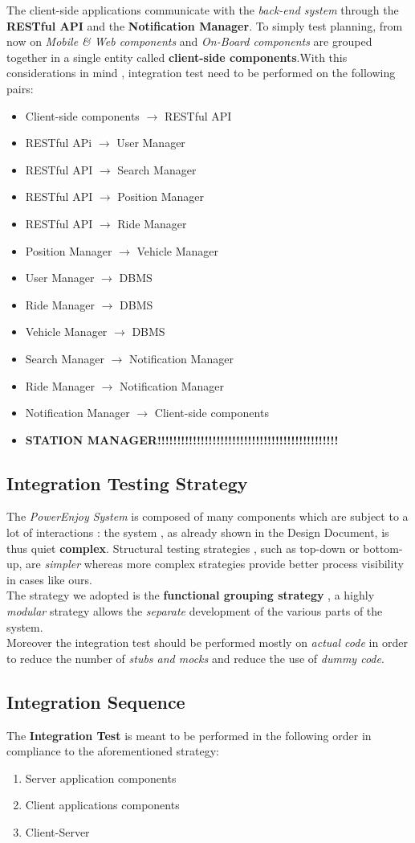 The client-side applications communicate with the \emph{back-end system} through the \textbf{RESTful API} and the \textbf{Notification Manager}. To simply test planning, from now on \emph{Mobile \& Web components} and \emph{On-Board components} are grouped together in a single entity called \textbf{client-side components}.With this considerations in mind , integration test need to be performed on the following pairs:
\begin{itemize}
\item Client-side components $\rightarrow$ RESTful API
\item RESTful APi $\rightarrow$ User Manager
\item RESTful API $\rightarrow$ Search Manager
\item RESTful API $\rightarrow$ Position Manager
\item RESTful API $\rightarrow$ Ride Manager
\item Position Manager $\rightarrow$ Vehicle Manager
\item User Manager $\rightarrow$ DBMS 
\item Ride Manager $\rightarrow$ DBMS
\item Vehicle Manager $\rightarrow$ DBMS
\item Search Manager $\rightarrow$ Notification Manager
\item Ride Manager $\rightarrow$ Notification Manager
\item Notification Manager $\rightarrow$ Client-side components
\item \textbf{STATION MANAGER!!!!!!!!!!!!!!!!!!!!!!!!!!!!!!!!!!!!!!!!!!!!!!}
\end{itemize}

\subsection{Integration Testing Strategy}
The \emph{PowerEnjoy System} is composed of many components which are subject to a lot of interactions : the system , as already shown in the Design Document, is thus quiet \textbf{complex}. Structural testing strategies , such as top-down or bottom-up, are \emph{simpler} whereas more complex strategies provide better process visibility in cases like ours.\\
The strategy we adopted is the \textbf{functional grouping strategy} , a highly \emph{modular} strategy allows the \emph{separate} development of the various parts of the system.\\
Moreover the integration test should be performed mostly on \emph{actual code} in order to reduce the number of \emph{stubs and mocks} and reduce the use of \emph{dummy code}.

\subsection{Integration Sequence}
The \textbf{Integration Test} is meant to be performed in the following order in compliance to the aforementioned  strategy:
\begin{enumerate}
\item Server application components
\item Client applications components
\item Client-Server
\end{enumerate}






